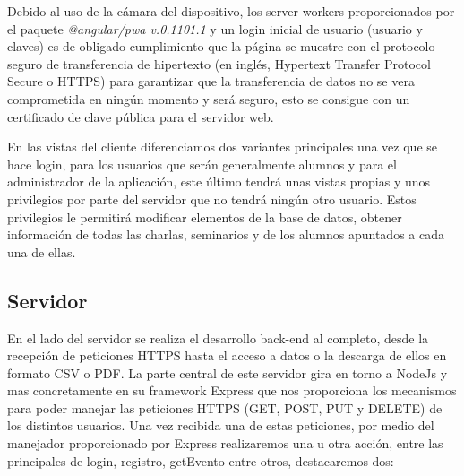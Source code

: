 \documentclass[a4paper, 12pt]{book}
\begin{document}
	Debido al uso de la cámara del dispositivo, los server workers proporcionados por el paquete \textit{@angular/pwa v.0.1101.1} y un login inicial de usuario (usuario y claves) es de obligado cumplimiento que la página se muestre con el protocolo seguro de transferencia de hipertexto (en inglés, Hypertext Transfer Protocol Secure o HTTPS)  para garantizar que la transferencia de datos no se vera comprometida en ningún momento y será seguro, esto se consigue con un certificado de clave pública para el servidor web.
	
	En las vistas del cliente diferenciamos dos variantes principales una vez que se hace login, para los usuarios que serán generalmente alumnos y para el administrador de la aplicación, este último tendrá unas vistas propias y unos privilegios por parte del servidor que no tendrá ningún otro usuario. Estos privilegios le permitirá modificar elementos de la base de datos, obtener información de todas las charlas, seminarios y de los alumnos apuntados a cada una de ellas.

	
\subsection{Servidor}
	En el lado del servidor se realiza el desarrollo back-end al completo, desde la recepción de peticiones HTTPS hasta el acceso a datos o la descarga de ellos en formato CSV o PDF.
	La parte central de este servidor gira en torno a NodeJs y mas concretamente en su framework Express que nos proporciona los mecanismos para poder manejar las peticiones HTTPS (GET, POST, PUT y DELETE) de los distintos usuarios. Una vez recibida una de estas peticiones, por medio del manejador proporcionado por Express realizaremos una u otra acción, entre las principales de login, registro, getEvento entre otros, destacaremos dos:
	
\end{document}
